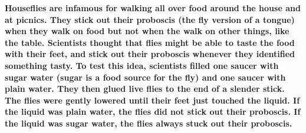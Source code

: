 \documentclass[11pt, addpoints]{exam}
\begin{document}
\begin{questions}
\textbf{Houseflies are infamous for walking all over food around the house
and at picnics. They stick out their proboscis (the fly version of a tongue)
when they walk on food but not when the walk on other things, like the table.
Scientists thought that flies might be able to taste the food with their feet,
and stick out their proboscis whenever they identified something tasty. To
test this idea, scientists filled one saucer with sugar water (sugar is a food
source for the fly) and one saucer with plain water. They then glued live 
flies to the end of a slender stick. The flies were gently lowered until their 
feet just touched the liquid. If the liquid was plain water, the flies did not stick
out their proboscis. If the liquid was sugar water, the flies always stuck out 
their proboscis.}




\end{questions}
\end{document}
